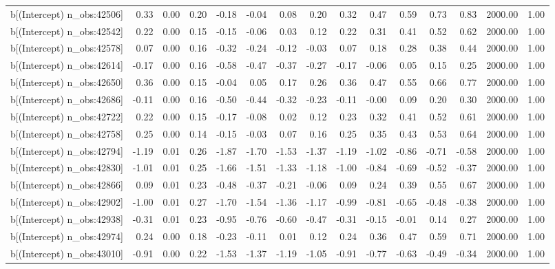 \begin{table}[ht]
\begin{tabular}{rrrrrrrrrrrrrrr}
  b[(Intercept) n\_obs:42506] & 0.33 & 0.00 & 0.20 & -0.18 & -0.04 & 0.08 & 0.20 & 0.32 & 0.47 & 0.59 & 0.73 & 0.83 & 2000.00 & 1.00 \\ 
  b[(Intercept) n\_obs:42542] & 0.22 & 0.00 & 0.15 & -0.15 & -0.06 & 0.03 & 0.12 & 0.22 & 0.31 & 0.41 & 0.52 & 0.62 & 2000.00 & 1.00 \\ 
  b[(Intercept) n\_obs:42578] & 0.07 & 0.00 & 0.16 & -0.32 & -0.24 & -0.12 & -0.03 & 0.07 & 0.18 & 0.28 & 0.38 & 0.44 & 2000.00 & 1.00 \\ 
  b[(Intercept) n\_obs:42614] & -0.17 & 0.00 & 0.16 & -0.58 & -0.47 & -0.37 & -0.27 & -0.17 & -0.06 & 0.05 & 0.15 & 0.25 & 2000.00 & 1.00 \\ 
  b[(Intercept) n\_obs:42650] & 0.36 & 0.00 & 0.15 & -0.04 & 0.05 & 0.17 & 0.26 & 0.36 & 0.47 & 0.55 & 0.66 & 0.77 & 2000.00 & 1.00 \\ 
  b[(Intercept) n\_obs:42686] & -0.11 & 0.00 & 0.16 & -0.50 & -0.44 & -0.32 & -0.23 & -0.11 & -0.00 & 0.09 & 0.20 & 0.30 & 2000.00 & 1.00 \\ 
  b[(Intercept) n\_obs:42722] & 0.22 & 0.00 & 0.15 & -0.17 & -0.08 & 0.02 & 0.12 & 0.23 & 0.32 & 0.41 & 0.52 & 0.61 & 2000.00 & 1.00 \\ 
  b[(Intercept) n\_obs:42758] & 0.25 & 0.00 & 0.14 & -0.15 & -0.03 & 0.07 & 0.16 & 0.25 & 0.35 & 0.43 & 0.53 & 0.64 & 2000.00 & 1.00 \\ 
  b[(Intercept) n\_obs:42794] & -1.19 & 0.01 & 0.26 & -1.87 & -1.70 & -1.53 & -1.37 & -1.19 & -1.02 & -0.86 & -0.71 & -0.58 & 2000.00 & 1.00 \\ 
  b[(Intercept) n\_obs:42830] & -1.01 & 0.01 & 0.25 & -1.66 & -1.51 & -1.33 & -1.18 & -1.00 & -0.84 & -0.69 & -0.52 & -0.37 & 2000.00 & 1.00 \\ 
  b[(Intercept) n\_obs:42866] & 0.09 & 0.01 & 0.23 & -0.48 & -0.37 & -0.21 & -0.06 & 0.09 & 0.24 & 0.39 & 0.55 & 0.67 & 2000.00 & 1.00 \\ 
  b[(Intercept) n\_obs:42902] & -1.00 & 0.01 & 0.27 & -1.70 & -1.54 & -1.36 & -1.17 & -0.99 & -0.81 & -0.65 & -0.48 & -0.38 & 2000.00 & 1.00 \\ 
  b[(Intercept) n\_obs:42938] & -0.31 & 0.01 & 0.23 & -0.95 & -0.76 & -0.60 & -0.47 & -0.31 & -0.15 & -0.01 & 0.14 & 0.27 & 2000.00 & 1.00 \\ 
  b[(Intercept) n\_obs:42974] & 0.24 & 0.00 & 0.18 & -0.23 & -0.11 & 0.01 & 0.12 & 0.24 & 0.36 & 0.47 & 0.59 & 0.71 & 2000.00 & 1.00 \\ 
  b[(Intercept) n\_obs:43010] & -0.91 & 0.00 & 0.22 & -1.53 & -1.37 & -1.19 & -1.05 & -0.91 & -0.77 & -0.63 & -0.49 & -0.34 & 2000.00 & 1.00 \\ 

\end{tabular}
\end{table}
